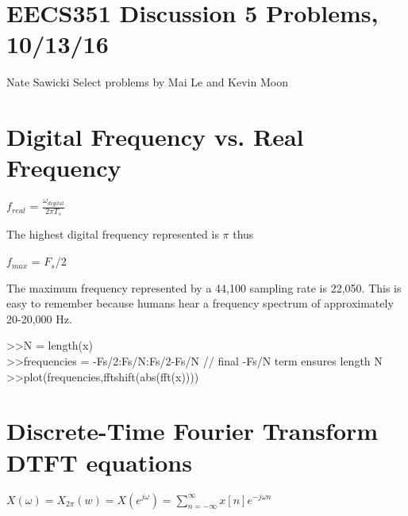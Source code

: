 \documentclass[11pt]{article}
\begin{document}
\section*{EECS351 Discussion 5 Problems, 10/13/16}
Nate Sawicki \newline
Select problems by Mai Le and Kevin Moon

\section{Digital Frequency vs. Real Frequency}

\begin{center}
$f_{real}$ = $\frac{\omega_{digital}}{2\pi T_s}$

\end{center}

The highest digital frequency represented is $\pi$ thus 

\begin{center}

$f_{max}$ = $F_s$/2
\end{center}

The maximum frequency represented by a 44,100 sampling rate is 22,050. This is easy to remember because humans hear a frequency spectrum of approximately 20-20,000 Hz.

\begin{center}

>>N = length(x)\\

>>frequencies = -Fs/2:Fs/N:Fs/2-Fs/N        \hspace{5mm}     // final -Fs/N term ensures length N\\
>>plot(frequencies,fftshift(abs(fft(x))))

\end{center}




\section{Discrete-Time Fourier Transform DTFT equations}

\vspace{3mm}

\begin{center}

$
X(\omega) = X_{2 \pi} (w) = X(e^{j \omega}) = \sum_{n = -\infty}^{\infty} x[n]  e^{-j \omega n}
$
\end{center}

\vspace{5mm}
\end{document}
